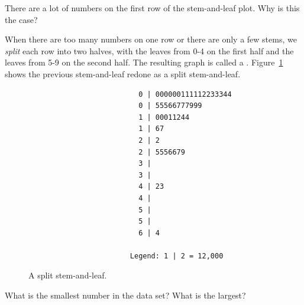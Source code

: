 \begin{exercisewrap}
\begin{nexercise}There are a lot of numbers on the first row of the stem-and-leaf plot. Why is this the case?\footnotemark
\end{nexercise}
\end{exercisewrap}

When there are too many numbers on one row or there are only a few stems, we \emph{split} each row into two halves, with the leaves from 0-4 on the first half and the leaves from 5-9 on the second half. The resulting graph is called a . Figure~\ref{splitstemandleaf50email} shows the previous stem-and-leaf redone as a split stem-and-leaf.

\begin{figure}[h]
\begin{verbatim}
                          0 | 000000111112233344
                          0 | 55566777999
                          1 | 00011244
                          1 | 67
                          2 | 2
                          2 | 5556679
                          3 |
                          3 |
                          4 | 23
                          4 |
                          5 |
                          5 |
                          6 | 4

                        Legend: 1 | 2 = 12,000
\end{verbatim}
\caption{A split stem-and-leaf.}
\label{splitstemandleaf50email}
\end{figure}

\begin{exercisewrap}
\begin{nexercise}
What is the smallest number in the  data set? What is the largest?\footnotemark
\end{nexercise}
\end{exercisewrap}


